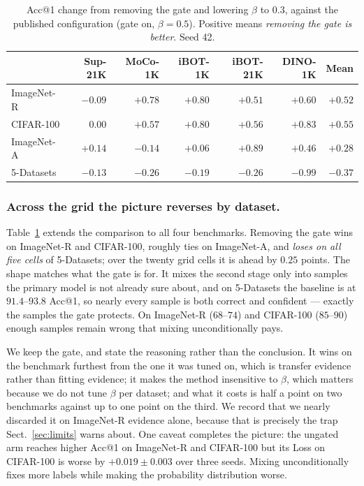 \documentclass[runningheads]{llncs}
\begin{document}
\begin{table}
\caption{Acc@1 change from removing the gate and lowering $\beta$ to $0.3$,
against the published configuration (gate on, $\beta=0.5$). Positive means
\emph{removing the gate is better}. Seed 42.}
\label{tab:gate-cross}
\begin{tabular}{lrrrrrr}
\hline
& Sup-21K & MoCo-1K & iBOT-1K & iBOT-21K & DINO-1K & Mean\\
\hline
ImageNet-R & $-0.09$ & $+0.78$ & $+0.80$ & $+0.51$ & $+0.60$ & $+0.52$\\
CIFAR-100  & $0.00$  & $+0.57$ & $+0.80$ & $+0.56$ & $+0.83$ & $+0.55$\\
ImageNet-A & $+0.14$ & $-0.14$ & $+0.06$ & $+0.89$ & $+0.46$ & $+0.28$\\
5-Datasets & $-0.13$ & $-0.26$ & $-0.19$ & $-0.26$ & $-0.99$ & $-0.37$\\
\hline
\end{tabular}
\end{table}

\subsubsection{Across the grid the picture reverses by dataset.}
Table~\ref{tab:gate-cross} extends the comparison to all four benchmarks.
Removing the gate wins on ImageNet-R and CIFAR-100, roughly ties on ImageNet-A,
and \emph{loses on all five cells} of 5-Datasets; over the twenty grid cells it
is ahead by $0.25$ points. The shape matches what the gate is for. It mixes the
second stage only into samples the primary model is not already sure about, and
on 5-Datasets the baseline is at $91.4$--$93.8$ Acc@1, so nearly every sample is
both correct and confident --- exactly the samples the gate protects. On
ImageNet-R ($68$--$74$) and CIFAR-100 ($85$--$90$) enough samples remain wrong
that mixing unconditionally pays.

We keep the gate, and state the reasoning rather than the conclusion. It wins on
the benchmark furthest from the one it was tuned on, which is transfer evidence
rather than fitting evidence; it makes the method insensitive to $\beta$, which
matters because we do not tune $\beta$ per dataset; and what it costs is half a
point on two benchmarks against up to one point on the third. We record that we
nearly discarded it on ImageNet-R evidence alone, because that is precisely the
trap Sect.~\ref{sec:limits} warns about. One caveat completes the picture: the
ungated arm reaches higher Acc@1 on ImageNet-R and CIFAR-100 but its Loss on
CIFAR-100 is worse by $+0.019 \pm 0.003$ over three seeds. Mixing unconditionally
fixes more labels while making the probability distribution worse.
\end{document}
